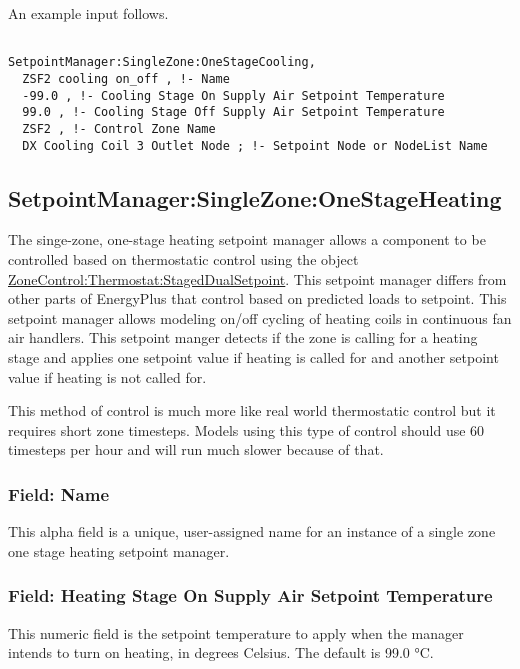 An example input follows.

\begin{lstlisting}

SetpointManager:SingleZone:OneStageCooling,
  ZSF2 cooling on_off , !- Name
  -99.0 , !- Cooling Stage On Supply Air Setpoint Temperature
  99.0 , !- Cooling Stage Off Supply Air Setpoint Temperature
  ZSF2 , !- Control Zone Name
  DX Cooling Coil 3 Outlet Node ; !- Setpoint Node or NodeList Name
\end{lstlisting}

\subsection{SetpointManager:SingleZone:OneStageHeating}\label{setpointmanagersinglezoneonestageheating}

The singe-zone, one-stage heating setpoint manager allows a component to be controlled based on thermostatic control using the object \hyperref[zonecontrolthermostatstageddualsetpoint]{ZoneControl:Thermostat:StagedDualSetpoint}. This setpoint manager differs from other parts of EnergyPlus that control based on predicted loads to setpoint. This setpoint manager allows modeling on/off cycling of heating coils in continuous fan air handlers. This setpoint manger detects if the zone is calling for a heating stage and applies one setpoint value if heating is called for and another setpoint value if heating is not called for.

This method of control is much more like real world thermostatic control but it requires short zone timesteps. Models using this type of control should use 60 timesteps per hour and will run much slower because of that.

\subsubsection{Field: Name}\label{field-name-26-001}

This alpha field is a unique, user-assigned name for an instance of a single zone one stage heating setpoint manager.

\subsubsection{Field: Heating Stage On Supply Air Setpoint Temperature}\label{field-heating-stage-on-supply-air-setpoint-temperature}

This numeric field is the setpoint temperature to apply when the manager intends to turn on heating, in degrees Celsius. The default is 99.0 °C.

